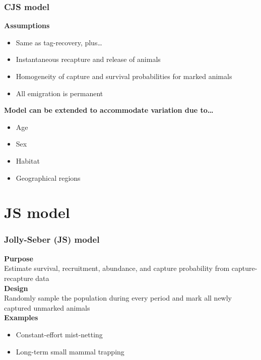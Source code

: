 \documentclass[color=usenames,dvipsnames]{beamer}\usepackage[]{graphicx}\usepackage[]{color}
\begin{document}
\begin{frame}
  \frametitle{CJS model}
  {\bf Assumptions}
  \begin{itemize}
    \item Same as tag-recovery, plus\dots
    \item Instantaneous recapture and release of animals
    \item Homogeneity of capture and survival probabilities for marked
      animals
    \item All emigration is permanent
  \end{itemize}
  \pause
  \vspace{0.5cm}
  {\bf Model can be extended to accommodate variation due to\dots}
  \begin{itemize}
    \item Age
    \item Sex
    \item Habitat
    \item Geographical regions
  \end{itemize}

\end{frame}


\section{JS model}


\begin{frame}
  \frametitle{Jolly-Seber (JS) model}
  {\bf Purpose} \\
  Estimate survival, recruitment, abundance, and capture probability
  from capture-recapture data \\
  \pause
  \vspace{0.5cm}
  {\bf Design} \\
  Randomly sample the population during every period and mark all
  newly captured unmarked animals \\
  \pause
  \vspace{0.5cm}
  {\bf Examples}
  \begin{itemize}
    \item Constant-effort mist-netting
    \item Long-term small mammal trapping
  \end{itemize}
\end{frame}
\end{document}

